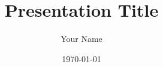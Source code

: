 \documentclass[
	10pt,
	t		%
	xcolor=dvipsnames
]{beamer}
\title{Presentation Title}
\author{Your Name}
\institute{Your Institution}
\date{\today}
\begin{document}
\begin{frame}
	\maketitle
	
	\def\svgwdith{\textwidth}
	
\end{frame}
\end{document}
